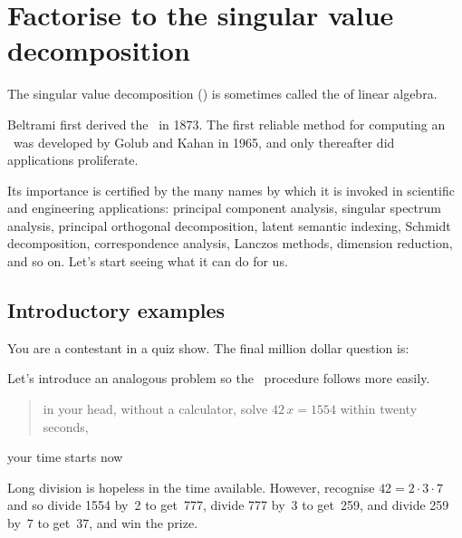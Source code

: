 

\section{Factorise to the singular value decomposition}
\label{sec:fisvd}
\secttoc

\begin{comment}
\pooliv{\S7.4} \holti{\S8.4} \cite[\S06]{Davis99a} \cite[\S8.7]{Nakos1998}
In a sense, the \svd\ replaces the \(\tr PLU\) factorisation of classic linear algebra, e.g.\ \pooliv{\S3.4}.
The computation of an \svd\ is well conditioned, unlike \textsc{lu} decomposition and eigenvalue calculations which are commonly poorly conditioned.
\end{comment}


The singular value decomposition (\svd) is sometimes called the  of  linear algebra.
\begin{aside}
Beltrami first derived the \svd\ in 1873.  
The first reliable method for computing an \svd\ was developed by Golub and Kahan in 1965, and only thereafter did applications proliferate.
\end{aside}
Its importance is certified by the many names by which it is invoked in scientific and engineering applications: principal component analysis, singular spectrum analysis, principal orthogonal decomposition, latent semantic indexing, Schmidt decomposition, correspondence analysis, Lanczos methods, dimension reduction, and so on.
Let's start seeing what it can do for us.




\subsection{Introductory examples}
\label{sec:svdeg}

You are a contestant in a quiz show.
The final million dollar question is: 
\begin{aside}
Let's introduce an analogous problem so the \svd\ procedure follows more easily.
\end{aside}
\begin{quote}
in your head, without a calculator, solve \(42\,x=1554\) within twenty seconds,
\end{quote} 
your time starts now \dotfill
\begin{solution} 
Long division is hopeless in the time available.  
However, recognise \(42=2\cdot3\cdot7\) and so divide 1554 by~2 to get~777, divide 777 by~3 to get~259, and divide 259 by~7 to get~37, and win the prize.
\end{solution}

